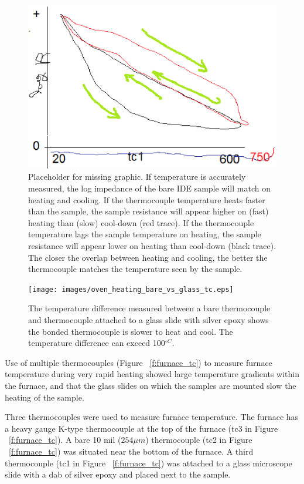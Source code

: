 \documentclass[12pt,oneside,english]{article}
\begin{document}
    \begin{figure}
    	\includegraphics[width=150mm]{images/plot_logR_vs_tc1_and_tc3.eps}
    	\caption{Placeholder for missing graphic.  If temperature is accurately measured, the log impedance of the bare IDE sample will match on heating and cooling.  If the thermocouple temperature heats faster than the sample, the sample resistance will appear higher on (fast) heating than (slow) cool-down (red trace).  If the thermocouple temperature lags the sample temperature on heating, the sample resistance will appear lower on heating than cool-down (black trace).  The closer the overlap between heating and cooling, the better the thermocouple matches the temperature seen by the sample. }
    	\label{f:logR_vs_t1_and_t3}
    \end{figure}
    
    \begin{figure}
    	\texttt{[image: images/oven\_heating\_bare\_vs\_glass\_tc.eps]}
    	\caption{The temperature difference measured between a bare thermocouple and thermocouple attached to a glass slide with silver epoxy shows the bonded thermocouple is slower to heat and cool.  The temperature difference can exceed 100$^{\circ C}$.}
    	\label{f:bare_vs_glass}
    \end{figure}

    Use of multiple thermocouples (Figure ~\ref{f:furnace_tc}) to measure furnace temperature during very rapid heating showed large temperature gradients within the furnace, and that the glass slides on which the samples are mounted slow the heating of the sample.

    Three thermocouples were used to measure furnace temperature.  
    The furnace has a heavy gauge K-type thermocouple at the top of the furnace (tc3 in Figure ~\ref{f:furnace_tc}).  
    A bare 10 mil ($254{\mu}m$) thermocouple (tc2 in Figure ~\ref{f:furnace_tc}) was situated near the bottom of the furnace.  
    A third thermocouple (tc1 in Figure ~\ref{f:furnace_tc}) was attached to a glass microscope slide with a dab of silver epoxy and placed next to the sample.
    
\end{document}
